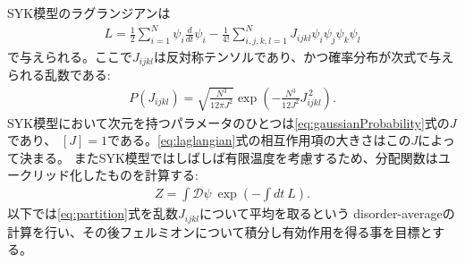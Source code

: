 \documentclass[a4]{ltjsarticle}
\newcommand{\deriv}{\frac{d}{dt}}
\newcommand{\pathint}[1]{\int \mathcal{D}#1 \ }
\begin{document}
	SYK模型のラグランジアンは
	\begin{align}
	L = \frac{1}{2}\sum_{i = 1}^{N} \psi_i \deriv \psi_i
		- \frac{1}{4!} \sum_{i,j,k,l = 1}^{N} J_{ijkl} \psi_i\psi_j\psi_k\psi_l
	\label{eq:laglangian}
	\end{align}
	で与えられる。ここで$J_{ijkl}$は反対称テンソルであり、かつ確率分布が次式で与えられる乱数である:
	\begin{align}
	P(J_{ijkl}) =
		\sqrt{\frac{N^3}{12\pi J^2}}\exp\left(-\frac{N^3}{12J^2}J_{ijkl}^{\, 2}\right).
	\label{eq:gaussianProbability}
	\end{align}
	SYK模型において次元を持つパラメータのひとつは\eqref{eq:gaussianProbability}式の$J$であり、
	$[J] = 1$である。\eqref{eq:laglangian}式の相互作用項の大きさはこの$J$によって決まる。
	またSYK模型ではしばしば有限温度を考慮するため、分配関数はユークリッド化したものを計算する:
	\begin{align}
	Z = \pathint{\psi} \exp\left(- \int dt\  L\right).
	\label{eq:partition}
	\end{align}
	以下では\eqref{eq:partition}式を乱数$J_{ijkl}$について平均を取るという
	disorder-averageの計算を行い、その後フェルミオンについて積分し有効作用を得る事を目標とする。
	
\end{document}
